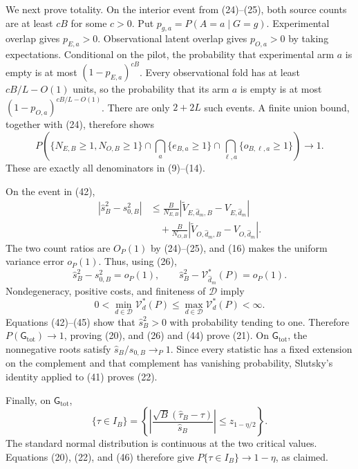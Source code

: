 We next prove totality.  On the interior event from (24)--(25), both source counts are at least \(cB\) for some \(c>0\).  Put \(p_{g,a}=P(A=a\mid G=g)\).  Experimental overlap gives \(p_{E,a}>0\).  Observational latent overlap gives \(p_{O,a}>0\) by taking expectations.  Conditional on the pilot, the probability that experimental arm \(a\) is empty is at most \((1-p_{E,a})^{cB}\).  Every observational fold has at least \(cB/L-O(1)\) units, so the probability that its arm \(a\) is empty is at most \((1-p_{O,a})^{cB/L-O(1)}\).  There are only \(2+2L\) such events.  A finite union bound, together with (24), therefore shows
\[
 P\left(
 \{N_{E,B}\ge1,N_{O,B}\ge1\}
 \cap\bigcap_a\{e_{B,a}\ge1\}
 \cap\bigcap_{\ell,a}\{o_{B,\ell,a}\ge1\}
 \right)\longrightarrow1.                                 \tag{42}
\]
These are exactly all denominators in (9)--(14).

On the event in (42),
\[
\begin{aligned}
 |\widehat s_B^2-s_{0,B}^2|
 &\le\frac{B}{N_{E,B}}
 |\widetilde V_{E,\widehat d_m,B}-V_{E,\widehat d_m}|\\
 &\quad+\frac{B}{N_{O,B}}
 |\widetilde V_{O,\widehat d_m,B}-V_{O,\widehat d_m}|.
\end{aligned}                                                \tag{43}
\]
The two count ratios are \(O_P(1)\) by (24)--(25), and (16) makes the uniform variance error \(o_P(1)\).  Thus, using (26),
\[
 \widehat s_B^2-s_{0,B}^2=o_P(1),
 \qquad
 \widehat s_B^2-\mathcal V_{\widehat d_m}^*(P)=o_P(1).      \tag{44}
\]
Nondegeneracy, positive costs, and finiteness of \(\mathcal D\) imply
\[
 0<\min_{d\in\mathcal D}\mathcal V_d^*(P)
 \le\max_{d\in\mathcal D}\mathcal V_d^*(P)<\infty.        \tag{45}
\]
Equations (42)--(45) show that \(\widehat s_B^2>0\) with probability tending to one.  Therefore \(P(\mathsf G_{\mathrm{tot}})\to1\), proving (20), and (26) and (44) prove (21).  On \(\mathsf G_{\mathrm{tot}}\), the nonnegative roots satisfy \(\widehat s_B/s_{0,B}\to_P1\).  Since every statistic has a fixed extension on the complement and that complement has vanishing probability, Slutsky's identity applied to (41) proves (22).

Finally, on \(\mathsf G_{\mathrm{tot}}\),
\[
 \{\tau\in I_B\}
 =\left\{\left|
 \frac{\sqrt B(\widehat\tau_B-\tau)}{\widehat s_B}
 \right|\le z_{1-\eta/2}\right\}.                          \tag{46}
\]
The standard normal distribution is continuous at the two critical values.  Equations (20), (22), and (46) therefore give \(P\{\tau\in I_B\}\to1-\eta\), as claimed.